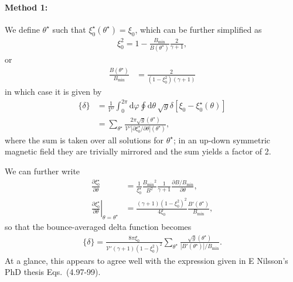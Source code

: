 \documentclass[11pt,a4paper]{article}
\newcommand{\rd}{\ensuremath{\mathrm{d}}}
\newcommand{\sub}[1]{\ensuremath{_{\text{#1}}}}
\begin{document}
\paragraph{Method 1:} 
We define $\theta^\star$ such that $\xi^\star_0(\theta^\star) = \xi_0$, which can be further simplified as
\begin{align}
\xi_0^2 = 1 - \frac{B\sub{min}}{B(\theta^\star)}\frac{2}{\gamma+1},
\end{align}
or
\begin{align}
\frac{B(\theta^\star)}{B\sub{min}} &= \frac{2}{(1-\xi_0^2)(\gamma+1)}
\end{align}
in which case it is given by
\begin{align}
\{ \delta \} &= \frac{1}{\mathcal{V'}} \int_0^{2\pi}\rd \varphi \oint \rd \theta \, \sqrt{g} \delta[\xi_0 - \xi^\star_0(\theta)] \nonumber \\
&= \sum_{\theta^\star} \frac{2\pi \sqrt{g}(\theta^\star)}{ \mathcal{V}' |\partial \xi_0^\star/\partial \theta|(\theta^\star)},
\end{align}
where the sum is taken over all solutions for $\theta^\star$; in an up-down symmetric magnetic field they are trivially mirrored and the sum yields a factor of 2.

We can further write
\begin{align}
\frac{\partial \xi_0^\star}{\partial \theta} &= \frac{1}{\xi_0^\star}\frac{B\sub{min}^2}{B^2}\frac{1}{\gamma+1} \frac{\partial B/B\sub{min}}{\partial \theta}, \nonumber \\
\left. \frac{\partial \xi_0^\star}{\partial \theta}\right|_{\theta=\theta^\star} &=  \frac{(\gamma+1)(1-\xi_0^2)^2}{4\xi_0} \frac{ B'(\theta^\star)}{B\sub{min}},
\end{align}
so that the bounce-averaged delta function becomes
\begin{align}
\{\delta \} = \frac{8\pi \xi_0}{\mathcal{V}' (\gamma+1)(1-\xi_0^2)^2} \sum_{\theta^\star} \frac{\sqrt{g}(\theta^\star)}{|B'(\theta^\star)|/B\sub{min}}.
\end{align}
At a glance, this appears to agree well with the expression given in E Nilsson's PhD thesis Eqs.~(4.97-99).
\end{document}
